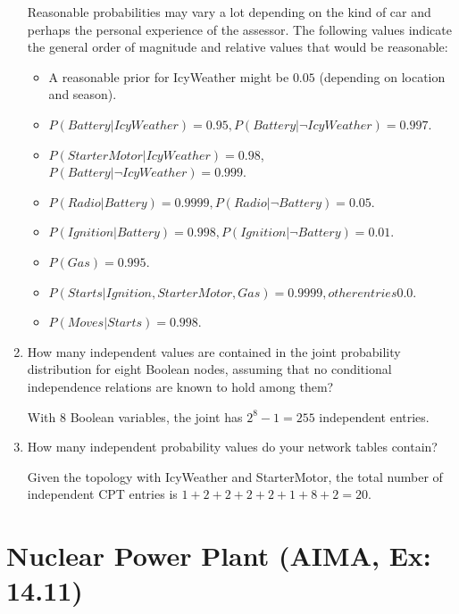 \documentclass[11pt, a4paper]{article}
\begin{document}
\begin{enumerate}
    \begin{solution}
        Reasonable probabilities may vary a lot depending on the kind of car and perhaps the personal experience of the assessor. The following values indicate the general order of magnitude and relative values that would be reasonable:
        \begin{itemize}
            \item A reasonable prior for IcyWeather might be $0.05$ (depending on location and season).
            \item $P(Battery|IcyWeather)=0.95,P(Battery|\lnot IcyWeather)=0.997$.
            \item $P(StarterMotor|IcyWeather) = 0.98$, $P(Battery|\lnot IcyWeather) = 0.999$.
            \item $P(Radio|Battery) = 0.9999, P (Radio|\lnot Battery) = 0.05$.
            \item $P(Ignition|Battery) = 0.998, P (Ignition|\lnot Battery) = 0.01$.
            \item $P(Gas) = 0.995$.
            \item $P(Starts|Ignition,StarterMotor,Gas) = 0.9999, other entries 0.0$.
            \item $P(Moves|Starts) = 0.998$.
        \end{itemize}
    \end{solution}
    
    \item How many independent values are contained in the joint probability distribution for eight Boolean nodes, assuming that no conditional independence relations are known to hold among them?
    
    \begin{solution}
        With 8 Boolean variables, the joint has $2^8 - 1 = 255$ independent entries.
    \end{solution}
    
    \item How many independent probability values do your network tables contain?
    
    \begin{solution}
        Given the topology with IcyWeather and StarterMotor, the total number of independent CPT entries is $1 + 2 + 2 + 2 + 2 + 1 + 8 + 2 = 20$.
    \end{solution}
\end{enumerate}

\newpage

\section{Nuclear Power Plant (AIMA, Ex: 14.11)}
\end{document}
